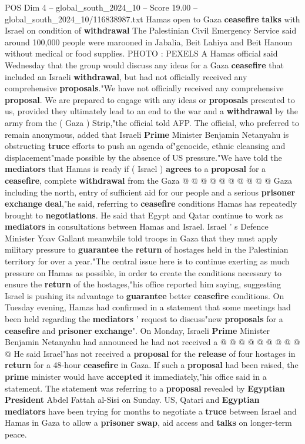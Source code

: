 \begin{textsample}{POS Dim 4 – global\_south\_2024\_10 – Score 19.00 – global\_south\_2024\_10/116838987.txt}  \label{ex:f4_pos_394}
Hamas open to Gaza \textbf{ceasefire} \textbf{talks} with Israel on condition of \textbf{withdrawal} The Palestinian Civil Emergency Service said around 100,000 people were marooned in Jabalia, Beit Lahiya and Beit Hanoun without medical or food supplies.
PHOTO : PEXELS A Hamas official said Wednesday that the group would discuss any ideas for a Gaza \textbf{ceasefire} that included an Israeli \textbf{withdrawal}, but had not officially received any comprehensive \textbf{proposals}."We have not officially received any comprehensive \textbf{proposal}.
We are prepared to engage with any ideas or \textbf{proposals} presented to us, provided they ultimately lead to an end to the war and a \textbf{withdrawal} by the army from the ( Gaza ) Strip,"the official told AFP.
The official, who preferred to remain anonymous, added that Israeli \textbf{Prime} Minister Benjamin Netanyahu is obstructing \textbf{truce} efforts to push an agenda of"genocide, ethnic cleansing and displacement"made possible by the absence of US pressure."We have told the \textbf{mediators} that Hamas is ready if ( Israel ) \textbf{agrees} to a \textbf{proposal} for a \textbf{ceasefire}, complete \textbf{withdrawal} from the Gaza @ @ @ @ @ @ @ @ @ @ Gaza including the north, entry of sufficient aid for our people and a serious \textbf{prisoner} \textbf{exchange} \textbf{deal},"he said, referring to \textbf{ceasefire} conditions Hamas has repeatedly brought to \textbf{negotiations}.
He said that Egypt and Qatar continue to work as \textbf{mediators} in consultations between Hamas and Israel.
Israel ' s Defence Minister Yoav Gallant meanwhile told troops in Gaza that they must apply military pressure to \textbf{guarantee} the \textbf{return} of hostages held in the Palestinian territory for over a year."The central issue here is to continue exerting as much pressure on Hamas as possible, in order to create the conditions necessary to ensure the \textbf{return} of the hostages,"his office reported him saying, suggesting Israel is pushing its advantage to \textbf{guarantee} better \textbf{ceasefire} conditions.
On Tuesday evening, Hamas had confirmed in a statement that some meetings had been held regarding the \textbf{mediators} ' request to discuss"new \textbf{proposals} for a \textbf{ceasefire} and \textbf{prisoner} \textbf{exchange}".
On Monday, Israeli \textbf{Prime} Minister Benjamin Netanyahu had announced he had not received a @ @ @ @ @ @ @ @ @ @ He said Israel"has not received a \textbf{proposal} for the \textbf{release} of four hostages in \textbf{return} for a 48-hour \textbf{ceasefire} in Gaza.
If such a \textbf{proposal} had been raised, the \textbf{prime} minister would have \textbf{accepted} it immediately,"his office said in a statement.
The statement was referring to a \textbf{proposal} revealed by \textbf{Egyptian} \textbf{President} Abdel Fattah al-Sisi on Sunday.
US, Qatari and \textbf{Egyptian} \textbf{mediators} have been trying for months to negotiate a \textbf{truce} between Israel and Hamas in Gaza to allow a \textbf{prisoner} \textbf{swap}, aid access and \textbf{talks} on longer-term peace.


\end{textsample}

